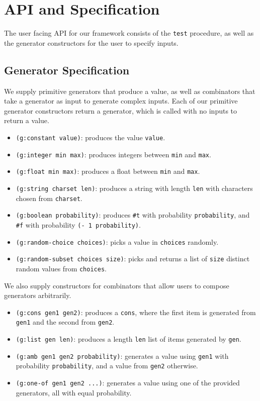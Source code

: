 \section{API and Specification}

The user facing API for our framework consists of the \verb|test| procedure, as well as the generator constructors for the user to specify inputs.

\subsection{Generator Specification}

We supply primitive generators that produce a value, as well as combinators that take a generator as input to generate complex inputs. Each of our primitive generator constructors return a generator, which is called with no inputs to return a value.
\begin{itemize}
	\item \verb|(g:constant value)|: produces the value \verb|value|.
	\item \verb|(g:integer min max)|: produces integers between \verb|min| and \verb|max|.
	\item \verb|(g:float min max)|: produces a float between \verb|min| and \verb|max|.
	\item \verb|(g:string charset len)|: produces a string with length \verb|len| with characters chosen from \verb|charset|.
	\item \verb|(g:boolean probability)|: produces \verb|#t| with probability \verb|probability|, and \verb|#f| with probability \verb|(- 1 probability)|.
	\item \verb|(g:random-choice choices)|: picks a value in \verb|choices| randomly.
	\item \verb|(g:random-subset choices size)|: picks and returns a list of
	      \verb|size| distinct random values from \verb|choices|.
\end{itemize}

We also supply constructors for combinators that allow users to compose generators arbitrarily.
\begin{itemize}
	\item \verb|(g:cons gen1 gen2)|: produces a \verb|cons|, where the first item is generated from \verb|gen1| and the second from \verb|gen2|.
	\item \verb|(g:list gen len)|: produces a length \verb|len| list of items generated by \verb|gen|.
	\item \verb|(g:amb gen1 gen2 probability)|: generates a value using \verb|gen1| with probability \verb|probability|, and a value from \verb|gen2| otherwise.
	\item \verb|(g:one-of gen1 gen2 ...)|: generates a value using one of the provided generators, all with equal probability.
\end{itemize}

